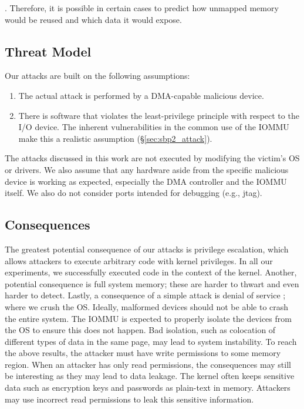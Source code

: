. Therefore, it is possible in certain cases to predict how unmapped memory would be reused and which data it would expose.  
\subsection{Threat Model}
Our attacks are built on the following assumptions:
\begin{enumerate}
    \item The actual attack is performed by a DMA-capable malicious device.
    \item There is software that violates the least-privilege principle with respect to the I/O device. The inherent vulnerabilities in the common use of the IOMMU make this a realistic assumption (§\ref{sec:sbp2_attack}). 
 \end{enumerate}
 The attacks discussed in this work are not executed by modifying the victim’s OS or drivers. We also assume that any hardware aside from the specific malicious device is working as expected, especially the DMA controller and the IOMMU itself. We also do not consider ports intended for debugging (e.g., jtag).
\subsection{Consequences}
The greatest potential consequence of our attacks is privilege escalation, which allows attackers to execute arbitrary code with kernel privileges. In all our experiments, we successfully executed code in the context of the kernel. Another, potential consequence is full system memory; these are harder to thwart and even harder to detect.  
Lastly, a consequence of a simple attack is denial of service \cite{MMT16}; where we crush the OS. Ideally, malformed devices should not be able to crash the entire system. The IOMMU is expected to properly isolate the devices from the OS to ensure this does not happen. Bad isolation, such as colocation of different types of data in the same page, may lead to system instability. To reach the above results, the attacker must have write permissions to some memory region. When an attacker has only read permissions, the consequences may still be interesting as they may lead to data leakage\cite{thunder}. The kernel often keeps sensitive data such as encryption keys and passwords as plain-text in memory. Attackers may use incorrect read permissions to leak this sensitive information.